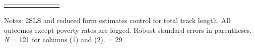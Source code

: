 \begin{table}[H]
{\begin{threeparttable}
\begin{tabular}{lcccccc}
\bottomrule[0.5pt]                                                                               \label{tab:table2}                                                                       \end{tabular}                                                                                                    \vspace{-13pt}                                                                                           \begin{tablenotes}[flushleft]{\setlength{\itemindent}{-3pt}}          \small                                                                                                           \item Notes: 2SLS and reduced form estimates control for total track length. All outcomes except poverty rates are logged. Robust standard errors in parentheses. \textit{N} = 121 for columns (1) and (2).  = 29.          \end{tablenotes}                                                                                         \end{threeparttable}                                                                             }                                                                                                                        \end{table}

